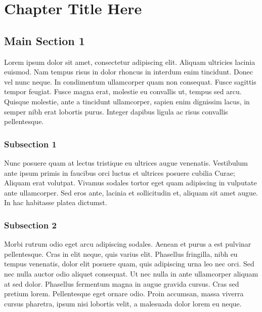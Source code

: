 
\chapter{Chapter Title Here} %

\label{ChapterX} %



\section{Main Section 1}

Lorem ipsum dolor sit amet, consectetur adipiscing elit. Aliquam ultricies lacinia euismod. Nam tempus risus in dolor rhoncus in interdum enim tincidunt. Donec vel nunc neque. In condimentum ullamcorper quam non consequat. Fusce sagittis tempor feugiat. Fusce magna erat, molestie eu convallis ut, tempus sed arcu. Quisque molestie, ante a tincidunt ullamcorper, sapien enim dignissim lacus, in semper nibh erat lobortis purus. Integer dapibus ligula ac risus convallis pellentesque.

\subsection{Subsection 1}

Nunc posuere quam at lectus tristique eu ultrices augue venenatis. Vestibulum ante ipsum primis in faucibus orci luctus et ultrices posuere cubilia Curae; Aliquam erat volutpat. Vivamus sodales tortor eget quam adipiscing in vulputate ante ullamcorper. Sed eros ante, lacinia et sollicitudin et, aliquam sit amet augue. In hac habitasse platea dictumst.


\subsection{Subsection 2}
Morbi rutrum odio eget arcu adipiscing sodales. Aenean et purus a est pulvinar pellentesque. Cras in elit neque, quis varius elit. Phasellus fringilla, nibh eu tempus venenatis, dolor elit posuere quam, quis adipiscing urna leo nec orci. Sed nec nulla auctor odio aliquet consequat. Ut nec nulla in ante ullamcorper aliquam at sed dolor. Phasellus fermentum magna in augue gravida cursus. Cras sed pretium lorem. Pellentesque eget ornare odio. Proin accumsan, massa viverra cursus pharetra, ipsum nisi lobortis velit, a malesuada dolor lorem eu neque.

